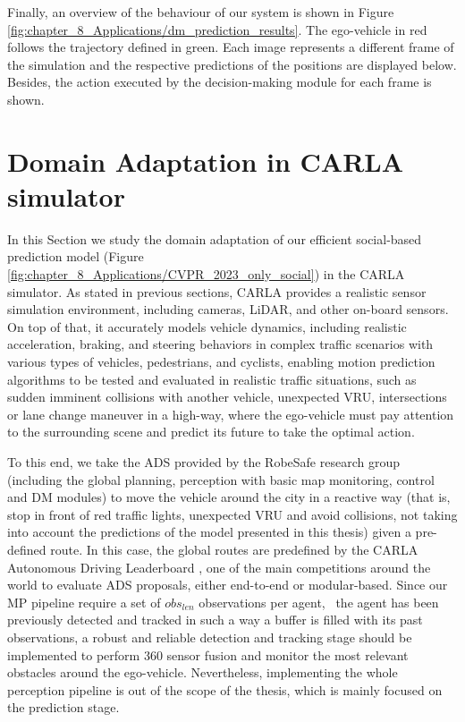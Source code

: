 Finally, an overview of the behaviour of our system is shown in Figure \ref{fig:chapter_8_Applications/dm_prediction_results}. The ego-vehicle in red follows the trajectory defined in green. Each image represents a different frame of the simulation and the respective predictions of the positions are displayed below. Besides, the action executed by the decision-making module for each frame is shown.

\section{Domain Adaptation in CARLA simulator}
\label{sec:8_domain_adaptation_carla}

In this Section we study the domain adaptation of our efficient social-based prediction model (Figure \ref{fig:chapter_8_Applications/CVPR_2023_only_social}) in the \ac{CARLA} simulator. As stated in previous sections, \ac{CARLA} provides a realistic sensor simulation environment, including cameras, \ac{LiDAR}, and other on-board sensors. On top of that, it accurately models vehicle dynamics, including realistic acceleration, braking, and steering behaviors in complex traffic scenarios with various types of vehicles, pedestrians, and cyclists, enabling motion prediction algorithms to be tested and evaluated in realistic traffic situations, such as sudden imminent collisions with another vehicle, unexpected \ac{VRU}, intersections or lane change maneuver in a high-way, where the ego-vehicle must pay attention to the surrounding scene and predict its future to take the optimal action. 

To this end, we take the \ac{ADS} provided by the RobeSafe research group (including the global planning, perception with basic map monitoring, control and \ac{DM}  modules) to move the vehicle around the city in a reactive way (that is, stop in front of red traffic lights, unexpected \ac{VRU} and avoid collisions, not taking into account the predictions of the model presented in this thesis) given a pre-defined route. In this case, the global routes are predefined by the \ac{CARLA} Autonomous Driving Leaderboard \cite{dosovitskiy2017carla}, one of the main competitions around the world to evaluate \ac{ADS} proposals, either end-to-end or modular-based. Since our \ac{MP} pipeline require a set of \textit{$obs_{len}$} observations per agent, \ie \ the agent has been previously detected and tracked in such a way a buffer is filled with its past observations, a robust and reliable detection and tracking stage should be implemented to perform 360 \degree sensor fusion and monitor the most relevant obstacles around the ego-vehicle. Nevertheless, implementing the whole perception pipeline is out of the scope of the thesis, which is mainly focused on the prediction stage.

